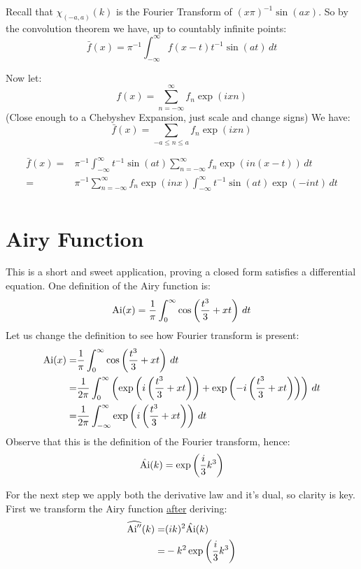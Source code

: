 Recall that $\chi_{(-a,a)}(k)$ is the Fourier Transform of $(x\pi)^{-1}\sin(ax)$.
So by the convolution theorem we have, up to countably infinite points:
\[ \bar{f}(x) = \pi^{-1}\int_{-\infty}^{\infty}f(x-t)t^{-1}\sin(at)\,dt\]

Now let:
\[f(x) = \sum_{n=-\infty}^{\infty}f_n\exp(ixn)\]
(Close enough to a Chebyshev Expansion, just scale and change signs)
We have:
\[\bar{f}(x) = \sum_{-a \leq n \leq a}f_n\exp(ixn)\]


\begin{equation*}
\begin{aligned}
\bar{f}(x) =& \pi^{-1}\int_{-\infty}^{\infty}t^{-1}\sin(at)\sum_{n=-\infty}^{\infty}f_n\exp(in(x-t))\,dt \\
=& \pi^{-1}\sum_{n=-\infty}^{\infty}f_n\exp(inx)\int_{-\infty}^{\infty}t^{-1}\sin(at)\exp(-int)\,dt \\
\end{aligned}
\end{equation*}
\section{Airy Function}
This is a short and sweet application, proving a closed form satisfies a differential equation.
One definition of the Airy function is:
\[\operatorname{Ai}(x) = \frac{1}{\pi}\int_{0}^{\infty}\cos\left(\frac{t^3}{3}+xt\right)\,dt\]
Let us change the definition to see how Fourier transform is present:
\begin{equation*}
\begin{aligned}
	\operatorname{Ai}(x) =& \frac{1}{\pi}\int_{0}^{\infty}\cos\left(\frac{t^3}{3}+xt\right)\,dt\\
	=&\frac{1}{2\pi}\int_{0}^{\infty}\left(\exp\left(i\left(\frac{t^3}{3}+xt\right)\right)+\exp\left(-i\left(\frac{t^3}{3}+xt\right)\right)\right)\,dt\\
	=&\frac{1}{2\pi}\int_{-\infty}^{\infty}\exp\left(i\left(\frac{t^3}{3}+xt\right)\right)\,dt\\
\end{aligned}
\end{equation*}
Observe that this is the definition of the Fourier transform, hence:
\[\hat{\operatorname{Ai}}(k) = \exp\left(\frac{i}{3}k^3\right)\]

For the next step we apply both the derivative law and it's dual, so clarity is key.
First we transform the Airy function \underline{after} deriving:
\begin{equation*}
\begin{aligned}
\widehat{\operatorname{Ai}''}(k) =& (ik)^2\hat{\operatorname{Ai}}(k) \\
=&-k^2\exp\left(\frac{i}{3}k^3\right)\\
\end{aligned}
\end{equation*}

